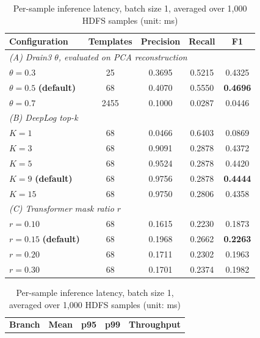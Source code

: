 \documentclass[conference]{IEEEtran}
\begin{document}
\begin{table}[!t]
\begin{minipage}[t]{0.48\textwidth}
\caption{Hyperparameter ablation study on HDFS 200k (seed 42)}
\begin{center}
\scriptsize
\setlength{\tabcolsep}{3pt}
\begin{tabular}{lcccc}
\toprule
\textbf{Configuration} & \textbf{Templates} & \textbf{Precision} & \textbf{Recall} & \textbf{F1} \\
\midrule
\multicolumn{5}{l}{\textit{(A) Drain3 $\theta$, evaluated on PCA reconstruction}} \\
$\theta=0.3$ & 25 & 0.3695 & 0.5215 & 0.4325 \\
$\theta=0.5$ \textbf{(default)} & 68 & 0.4070 & 0.5550 & \textbf{0.4696} \\
$\theta=0.7$ & 2455 & 0.1000 & 0.0287 & 0.0446 \\
\midrule
\multicolumn{5}{l}{\textit{(B) DeepLog top-k}} \\
$K=1$ & 68 & 0.0466 & 0.6403 & 0.0869 \\
$K=3$ & 68 & 0.9091 & 0.2878 & 0.4372 \\
$K=5$ & 68 & 0.9524 & 0.2878 & 0.4420 \\
$K=9$ \textbf{(default)} & 68 & 0.9756 & 0.2878 & \textbf{0.4444} \\
$K=15$ & 68 & 0.9750 & 0.2806 & 0.4358 \\
\midrule
\multicolumn{5}{l}{\textit{(C) Transformer mask ratio $r$}} \\
$r=0.10$ & 68 & 0.1615 & 0.2230 & 0.1873 \\
$r=0.15$ \textbf{(default)} & 68 & 0.1968 & 0.2662 & \textbf{0.2263} \\
$r=0.20$ & 68 & 0.1711 & 0.2302 & 0.1963 \\
$r=0.30$ & 68 & 0.1701 & 0.2374 & 0.1982 \\
\bottomrule
\end{tabular}
\label{tab_ablation}
\end{center}
\end{minipage}
\hfill
\begin{minipage}[t]{0.48\textwidth}
\caption{Per-sample inference latency, batch size 1, averaged over 1,000 HDFS samples (unit: ms)}
\begin{center}
\scriptsize
\setlength{\tabcolsep}{3pt}
\begin{tabular}{lcccc}
\toprule
\textbf{Branch} & \textbf{Mean} & \textbf{p95} & \textbf{p99} & \textbf{Throughput} \\

\end{tabular}
\end{center}
\end{minipage}
\end{table}
\end{document}
